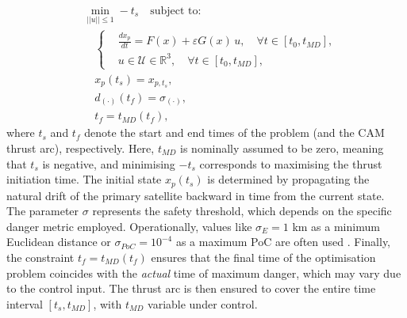 \documentclass[letterpaper, preprint, paper,11pt]{AAS}	%
\newcommand{\md}{MD}
\newcommand{\ts}{s}
\newcommand{\tf}{f}
\begin{document}
\begin{equation}\label{eq:OriginalProblem}
	\begin{aligned}
		&\min_{||u|| \leq 1} -t_{\ts} \quad \text{subject to:} \\ %
		&\quad \left\{ %
		\begin{aligned} %
			&\frac{dx_p}{dt} = F(x) + \varepsilon G(x) \, u, \quad \forall t \in [t_0, t_{\md}], \\[10pt] %
			&u \in \mathcal{U} \in \mathbb{R}^3, \quad \forall t \in [t_0, t_{\md}],
		\end{aligned} %
		\right. \\ %
		&\quad x_p(t_{\ts}) = x_{p,t_{\ts}}, \\[5pt]
		&\quad d_{(\cdot)}(t_{\tf}) = \sigma_{(\cdot)}, \\[5pt]
		&\quad t_{\tf} = t_{\md}(t_{\tf}), %
	\end{aligned}
\end{equation}
where \( t_s \) and \( t_f \) denote the start and end times of the problem (and the CAM thrust arc), respectively. Here, \( t_{MD} \) is nominally assumed to be zero, meaning that \( t_s \)  is negative, and minimising \( -t_s \) corresponds to maximising the thrust initiation time. The initial state \( x_p(t_s) \) is determined by propagating the natural drift of the primary satellite backward in time from the current state. The parameter \( \sigma \) represents the safety threshold, which depends on the specific danger metric employed. Operationally, values like $\sigma_{E} = 1$ km as a minimum Euclidean distance or $\sigma_{PoC} = 10^{-4}$ as a maximum PoC are often used \cite{symonds2014operational}. Finally, the constraint \( t_f = t_{MD}(t_f) \) ensures that the final time of the optimisation problem coincides with the \textit{actual} time of maximum danger, which may vary due to the control input. The thrust arc is then ensured to cover the entire time interval $[t_s, t_{MD}]$, with $t_{MD}$ variable under control.
\end{document}
